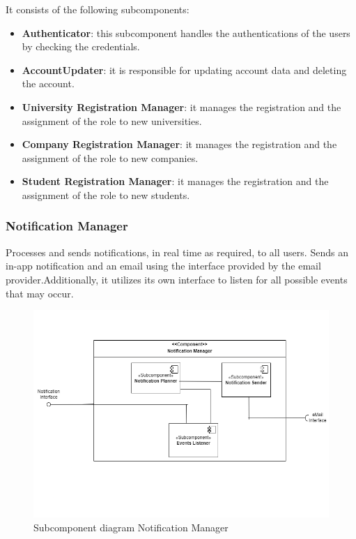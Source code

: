    It consists of the following subcomponents:
   \begin{itemize}
    \item  \textbf{Authenticator}: this subcomponent handles the authentications of the users by checking the credentials.
    \item  \textbf{AccountUpdater}: it is responsible for updating account data and deleting the account.
    \item  \textbf{University Registration Manager}: it manages the registration and the assignment of the role to new universities.
    \item  \textbf{Company Registration Manager}: it manages the registration and the assignment of the role to new companies.
    \item  \textbf{Student Registration Manager}: it manages the registration and the assignment of the role to new students.
    \end{itemize}

\newpage

\subsubsection{Notification Manager}Processes and sends notifications, in real time as required, to all users. Sends an in-app notification and an email using the interface provided by the email provider.Additionally, it utilizes its own interface to listen for all possible events that may occur.
   
\begin{figure}[H]
    \centering
    \includegraphics[width=\linewidth]{DD/Images/Comp&Sub/NotificationManager.png}
    \caption{Subcomponent diagram Notification Manager}
    \label{fig:notification_manager}
\end{figure}
    
